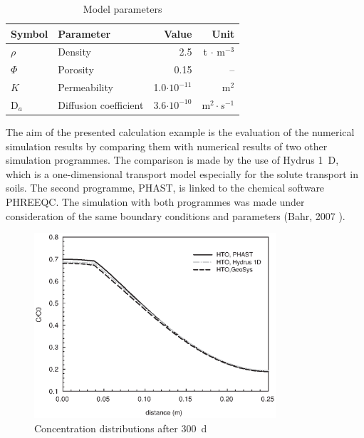 \begin{table}[h]%
\begin{center}
\begin{tabular}{llrr}
\toprule
Symbol & Parameter & Value & Unit \\
\midrule
$\rho$ & Density & 2.5 & t $\cdot$ m$^{-3}$  \\			
$\Phi$ & Porosity & 0.15 & -- \\
$K$ & Permeability & 1.0$\cdot 10^{-11}$ & m$^2$ \\
D$_a$ & Diffusion coefficient & 3.6$\cdot 10^{-10}$ & m$^2\cdot s^{-1}$  \\
\bottomrule
\end{tabular}
\caption{Model parameters}
\label{tab53}
\end{center}
\end{table}


The aim of the presented calculation example is the evaluation of the numerical simulation results by comparing them with numerical results of two other simulation programmes. The comparison is made by the use of Hydrus 1~D, which is a one-dimensional transport model especially for the solute transport in soils. The second programme, PHAST, is linked to the chemical software PHREEQC. The simulation with both programmes was made under consideration of the same boundary conditions and parameters (Bahr, 2007 \cite{Bahr:2007}).

\begin{figure}[htbp]
\centering
\includegraphics[width=0.8\textwidth]{PART_II/C/fig510.EPS}
\caption{Concentration distributions after 300~d}
\label{fig510}
\end{figure}

